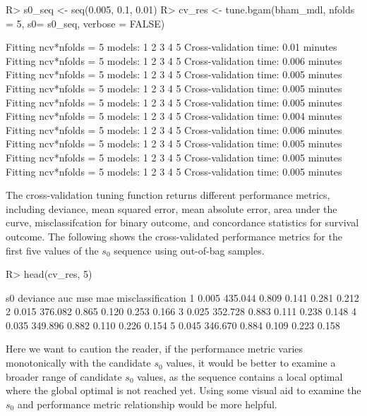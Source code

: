 \documentclass[
]{jss}
\begin{document}
\begin{CodeChunk}
\begin{CodeInput}
R> s0_seq <- seq(0.005, 0.1, 0.01)
R> cv_res <- tune.bgam(bham_mdl, nfolds = 5, s0= s0_seq, verbose = FALSE)
\end{CodeInput}
\begin{CodeOutput}
Fitting ncv*nfolds = 5 models: 
1 2 3 4 5 
 Cross-validation time: 0.01 minutes 
Fitting ncv*nfolds = 5 models: 
1 2 3 4 5 
 Cross-validation time: 0.006 minutes 
Fitting ncv*nfolds = 5 models: 
1 2 3 4 5 
 Cross-validation time: 0.005 minutes 
Fitting ncv*nfolds = 5 models: 
1 2 3 4 5 
 Cross-validation time: 0.005 minutes 
Fitting ncv*nfolds = 5 models: 
1 2 3 4 5 
 Cross-validation time: 0.005 minutes 
Fitting ncv*nfolds = 5 models: 
1 2 3 4 5 
 Cross-validation time: 0.004 minutes 
Fitting ncv*nfolds = 5 models: 
1 2 3 4 5 
 Cross-validation time: 0.006 minutes 
Fitting ncv*nfolds = 5 models: 
1 2 3 4 5 
 Cross-validation time: 0.005 minutes 
Fitting ncv*nfolds = 5 models: 
1 2 3 4 5 
 Cross-validation time: 0.005 minutes 
Fitting ncv*nfolds = 5 models: 
1 2 3 4 5 
 Cross-validation time: 0.005 minutes 
\end{CodeOutput}
\end{CodeChunk}

The cross-validation tuning function returns different performance
metrics, including deviance, mean squared error, mean absolute error,
area under the curve, misclassifcation for binary outcome, and
concordance statistics for survival outcome. The following shows the
cross-validated performance metrics for the first five values of the
\(s_0\) sequence using out-of-bag samples.

\begin{CodeChunk}
\begin{CodeInput}
R> head(cv_res, 5)
\end{CodeInput}
\begin{CodeOutput}
     s0 deviance   auc   mse   mae misclassification
1 0.005  435.044 0.809 0.141 0.281             0.212
2 0.015  376.082 0.865 0.120 0.253             0.166
3 0.025  352.728 0.883 0.111 0.238             0.148
4 0.035  349.896 0.882 0.110 0.226             0.154
5 0.045  346.670 0.884 0.109 0.223             0.158
\end{CodeOutput}
\end{CodeChunk}

Here we want to caution the reader, if the performance metric varies
monotonically with the candidate \(s_0\) values, it would be better to
examine a broader range of candidate \(s_0\) values, as the sequence
contains a local optimal where the global optimal is not reached yet.
Using some visual aid to examine the \(s_0\) and performance metric
relationship would be more helpful.
\end{document}
